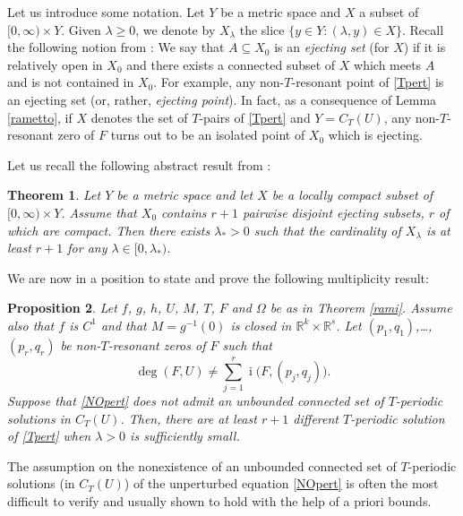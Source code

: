 \documentclass[a4paper]{amsart}
\numberwithin{equation}{section}
\newtheorem{theorem}{Theorem}[section]
\newtheorem{proposition}[theorem]{Proposition}
\DeclareMathOperator{\idx}{\mathrm{i}}
\newcommand{\R}{\mathbb{R}}
\begin{document}
 
Let us introduce some notation. Let $Y$ be a metric space and $X$ a subset of 
$[0,\infty )\times Y$. Given $\lambda \geq 0$, we denote by $X _{\lambda}$ the slice 
$\big\{y\in Y:(\lambda ,y)\in X \big\}$. Recall the following notion from \cite{FPS00}:
We say that $A\subseteq X_0$ is an {\it ejecting set} (for $X$) if it is relatively open 
in $X_0$ and there exists a connected subset of $X$ which meets $A$ and is not contained 
in $X_0$. For example,  any non-$T$-resonant point of \eqref{Tpert} is an ejecting set 
(or, rather, \textit{ejecting point}). In fact, as a consequence of Lemma \ref{rametto}, 
if $X$ denotes the set of $T$-pairs of \eqref{Tpert} and $Y=C_T(U)$, any non-$T$-resonant 
zero of $F$ turns out to be an isolated point of $X_0$ which is ejecting.

Let us recall the following abstract result from \cite{FPS00}:

\begin{theorem}
\label{conn2} Let $Y$ be a metric space and let $X$ be a locally compact subset of 
$[0,\infty )\times Y$. Assume that $X_0$ contains $r+1$ pairwise disjoint ejecting 
subsets, $r$ of which are compact. Then there exists $\lambda _{*}>0$ such that the
cardinality of $X_\lambda$ is at least $r+1$ for any $\lambda \in [0,\lambda _{*})$.
\end{theorem}

We are now in a position to state and prove the following multiplicity result:

\begin{proposition}\label{mults}
 Let $f$, $g$, $h$, $U$, $M$, $T$, $F$ and $\Omega$ be as in Theorem \ref{rami}. 
Assume also that $f$ is $C^1$ and that $M=g^{-1}(0)$ is closed in $\R^k\times\R^s$. 
Let $(p_1,q_1)$,\ldots, $(p_{r},q_{r})$ be non-$T$-resonant zeros of $F$ such that 
\[
\deg(F,U)\neq\sum_{j=1}^{r} \idx\big(F,(p_j,q_j)\big).
\]
Suppose that \eqref{NOpert} does not admit an unbounded connected set of $T$-periodic
solutions in $C_T(U)$. Then, there are at least $r+1$ different $T$-periodic solution 
of \eqref{Tpert} when $\lambda>0$ is sufficiently small.
\end{proposition}

The assumption on the nonexistence of an unbounded connected set of $T$-periodic
solutions (in $C_T(U)$) of the unperturbed equation \eqref{NOpert} is often the most 
difficult to verify and usually shown to hold with the help of a priori bounds. 
\end{document}
